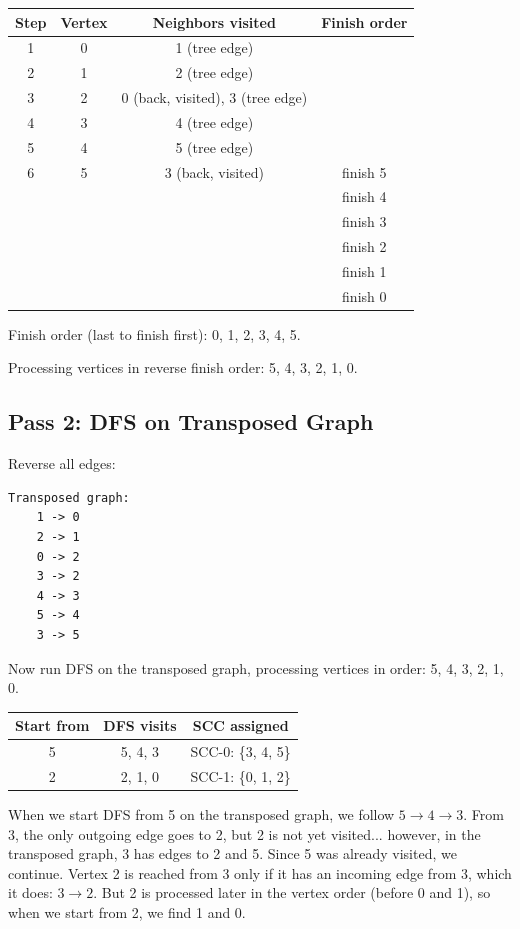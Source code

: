 \begin{center}
\begin{tabular}{cccc}
\toprule
Step & Vertex & Neighbors visited & Finish order \\
\midrule
1 & 0 & 1 (tree edge) & \\
2 & 1 & 2 (tree edge) & \\
3 & 2 & 0 (back, visited), 3 (tree edge) & \\
4 & 3 & 4 (tree edge) & \\
5 & 4 & 5 (tree edge) & \\
6 & 5 & 3 (back, visited) & finish 5 \\
& & & finish 4 \\
& & & finish 3 \\
& & & finish 2 \\
& & & finish 1 \\
& & & finish 0 \\
\bottomrule
\end{tabular}
\end{center}

Finish order (last to finish first): 0, 1, 2, 3, 4, 5.

Processing vertices in reverse finish order: 5, 4, 3, 2, 1, 0.

\subsection{Pass 2: DFS on Transposed Graph}

Reverse all edges:

\begin{lstlisting}
Transposed graph:
    1 -> 0
    2 -> 1
    0 -> 2
    3 -> 2
    4 -> 3
    5 -> 4
    3 -> 5
\end{lstlisting}

Now run DFS on the transposed graph, processing vertices in order: 5, 4, 3, 2, 1, 0.

\begin{center}
\begin{tabular}{ccc}
\toprule
Start from & DFS visits & SCC assigned \\
\midrule
5 & 5, 4, 3 & SCC-0: \{3, 4, 5\} \\
2 & 2, 1, 0 & SCC-1: \{0, 1, 2\} \\
\bottomrule
\end{tabular}
\end{center}

When we start DFS from 5 on the transposed graph, we follow $5 \to 4 \to 3$. From 3, the only outgoing edge goes to 2, but 2 is not yet visited... however, in the transposed graph, 3 has edges to 2 and 5. Since 5 was already visited, we continue. Vertex 2 is reached from 3 only if it has an incoming edge from 3, which it does: $3 \to 2$. But 2 is processed later in the vertex order (before 0 and 1), so when we start from 2, we find 1 and 0.

